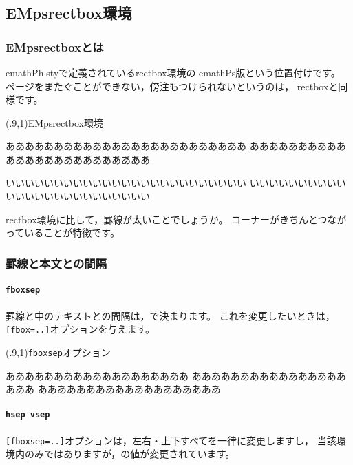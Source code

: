 \documentclass[a4j]{jarticle}
\begin{document}
\subsection{\textsf{EMpsrectbox}環境}
\subsubsection{\textsf{EMpsrectbox}とは}
\textsf{emathPh.sty}で定義されている\textsf{rectbox}環境の
\textsf{emathPs}版という位置付けです。
ページをまたぐことができない，傍注もつけられないというのは，
\textsf{rectbox}と同様です。

\begin{showEx}(.9,1){\textsf{EMpsrectbox}環境}
\begin{EMpsrectbox}
あああああああああああああああああああああああああ
あああああああああああああああああああああああああ

いいいいいいいいいいいいいいいいいいいいいいいいい
いいいいいいいいいいいいいいいいいいいいいいいいい
\end{EMpsrectbox}
\end{showEx}

\textsf{rectbox}環境に比して，罫線が太いことでしょうか。
コーナーがきちんとつながっていることが特徴です。
\pagebreak

\subsubsection{罫線と本文との間隔}
\paragraph{\texttt{fboxsep}}
罫線と中のテキストとの間隔は，で決まります。
これを変更したいときは，\verb+[fbox=..]+オプションを与えます。

\begin{showEx}(.9,1){\texttt{fboxsep}オプション}
\begin{EMpsrectbox}[fboxsep=1\zw]
あああああああああああああああああああ
あああああああああああああああああああ
あああああああああああああああああああ
\end{EMpsrectbox}
\end{showEx}

\paragraph{\texttt{hsep vsep}}
\verb+[fboxsep=..]+オプションは，左右・上下すべてを一律に変更しますし，
当該環境内のみではありますが，の値が変更されています。
\end{document}
